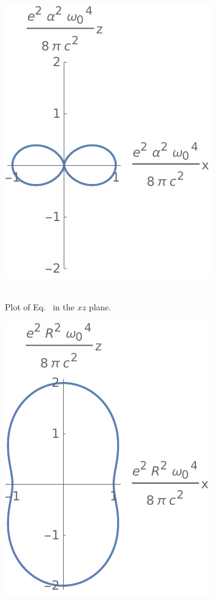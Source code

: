 \begin{figure}[b!]
	\begin{minipage}{0.475\textwidth}
		\begin{figure}[H] \flushright
			\includegraphics{3a} $\ $
			\caption{Plot of Eq.~ in the $xz$ plane.}
			\label{3a}
		\end{figure}
	\end{minipage}%
	\hspace{0.05\linewidth}%
	\begin{minipage}{0.475\textwidth}
		\begin{figure}[H] \flushright
			\includegraphics{3b} $\ $

\end{figure}
\end{minipage}
\end{figure}
